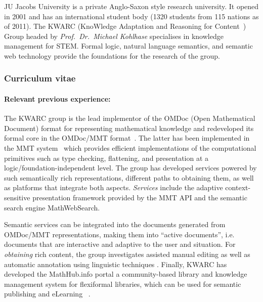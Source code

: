 \begin{sitedescription}{JU}
Jacobs University is a private Anglo-Saxon style research university.  It opened in 2001
and has an international student body (1320 students from 115 nations as of 2011).  The
KWARC (KnoWledge Adaptation and Reasoning for Content~\cite{KWARC:online}) Group headed by
{\emph{Prof.\ Dr.\ Michael Kohlhase}} specialises in knowledge management for STEM.
Formal logic, natural language semantics, and semantic web technology provide the
foundations for the research of the group.

\subsubsection*{Curriculum vitae}





\paragraph{Relevant previous experience:}

The KWARC group is the lead implementor of the OMDoc (Open Mathematical Document) format
for representing mathematical knowledge \cite{Kohlhase:OMDoc1.2} and redeveloped its
formal core in the OMDoc/MMT format~\cite{RabKoh:WSMSML13}. The latter has been
implemented in the MMT system~\cite{MMTSVN:on,RabKoh:WSMSML13} which provides efficient
implementations of the computational primitives such as type checking, flattening, and
presentation at a logic/foundation-independent level.  The group has developed services
powered by such semantically rich representations, different paths to obtaining them, as
well as platforms that integrate both aspects.  \emph{Services} include the adaptive
context-sensitive presentation framework provided by the MMT API and the semantic search
engine MathWebSearch\cite{KohSuc:asemf06,ProKoh:mwssofse12}. 

Semantic services can be integrated into the documents generated from OMDoc/MMT
representations, making them into ``active documents'', i.e. documents that are
interactive and adaptive to the user and situation.  For \emph{obtaining} rich content,
the group investigates assisted manual editing \cite{JucKoh:sidesc10:biblatex} as well as
automatic annotation using linguistic techniques \cite{GinJucAnc:alsaacl09}.  Finally,
KWARC has developed the \textsf{MathHub.info} portal a community-based library and
knowledge management system for flexiformal libraries, which can be used for semantic
publishing and eLearning~ \cite{KohDavGin:psewads11,MathHub:on,IanJucKoh:sdm14}.


\end{sitedescription}
